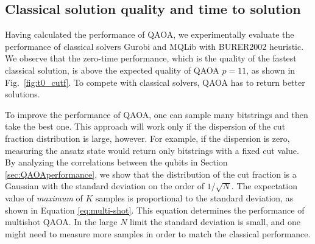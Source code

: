 \documentclass[prb,reprint,nofootinbib,longbibliography,superscriptaddress]{revtex4-1}
\begin{document}
\subsection{Classical solution quality and time to solution}
Having calculated the performance of QAOA, we experimentally evaluate the performance of classical solvers Gurobi and MQLib with BURER2002 heuristic. We observe that the zero-time performance, which is the quality of the fastest classical solution, is above the expected quality of QAOA $p=11$, as shown in Fig.~\ref{fig:t0_cutf}. To compete with classical solvers, QAOA has to return better solutions.

To improve the performance of QAOA, one can sample many bitstrings and then take the best one. This approach will  work only  if the  dispersion of the cut fraction distribution is large, however. For example, if the  dispersion is zero, measuring the ansatz state would return only bitstrings with a fixed cut value. By analyzing the correlations between the qubits in Section \ref{sec:QAOAperformance}, we show that the distribution of the cut fraction is a Gaussian with the  standard deviation on the order of $1/\sqrt N$. The expectation value of \emph{maximum} of $K$ samples is proportional to the  standard deviation, as shown in Equation \ref{eq:multi-shot}. This equation determines the performance of multishot QAOA. In the large $N$ limit the  standard deviation is small, and one might need to measure more samples in order to match the classical performance.
\end{document}
